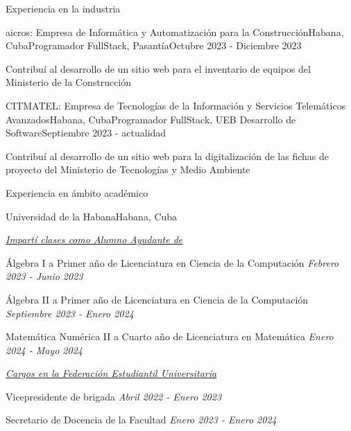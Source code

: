 \documentclass{resume} %
\begin{document}
\begin{rSection}{Experiencia en la industria}

\begin{rSubsection}{aicros: Empresa de Informática y Automatización para la Construcción}{Habana, Cuba}{Programador FullStack, Pasantía}{Octubre 2023 - Diciembre 2023}
\item Contribuí al desarrollo de un sitio web para el inventario de equipos del Ministerio de la Construcción
\end{rSubsection}

\begin{rSubsection}{CITMATEL: Empresa de Tecnologías de la Información y Servicios Telemáticos Avanzados}{Habana, Cuba}{Programador FullStack, UEB Desarrollo de Software}{Septiembre 2023 - actualidad}
\item Contribuí al desarrollo de un sitio web para la digitalización de las fichas de proyecto del Ministerio de Tecnologías y Medio Ambiente
\end{rSubsection}

\end{rSection}


\begin{rSection}{Experiencia en ámbito académico}

	\begin{rSubsection}{Universidad de la Habana}{Habana, Cuba}{}

	{}{\it \underline{Impartí clases como Alumno Ayudante de}}\\
	\item Álgebra I a Primer año de Licenciatura en Ciencia de la Computación \hfill {\em Febrero 2023 - Junio 2023}
	\item  Álgebra II a Primer año de Licenciatura en Ciencia de la Computación \hfill {\em Septiembre 2023 - Enero 2024}
	\item  Matemática Numérica II a Cuarto año de  Licenciatura en Matemática \hfill {\em Enero 2024 - Mayo 2024}
	
	{}{\it \underline{ Cargos en la Federación Estudiantil Universitaria}}\\
	\item Vicepresidente de brigada \hfill {\em Abril 2022 - Enero 2023}
	\item Secretario de Docencia de la Facultad \hfill {\em Enero 2023 - Enero 2024}

	\end{rSubsection}

\end{rSection}
\end{document}
